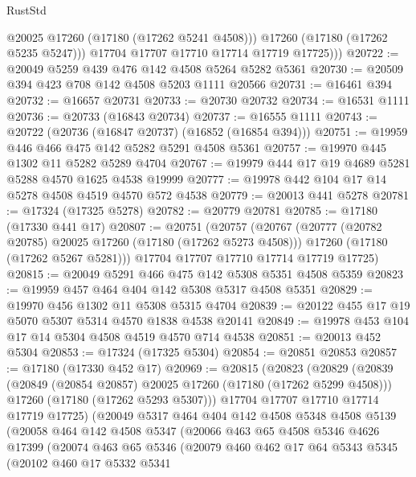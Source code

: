 \begin{lexlean}{RustStd}
\begin{coremodule}
              @20025
              @17260
              (@17180 (@17262 @5241 @4508)))
            @17260
            (@17180 (@17262 @5235 @5247)))
          @17704
          @17707
          @17710
          @17714
          @17719
          @17725)))
@20722 := @20049 @5259 @439 @476 @142 @4508 @5264 @5282 @5361
@20730 := @20509 @394 @423 @708 @142 @4508 @5203 @1111 @20566
@20731 := @16461 @394
@20732 := @16657 @20731
@20733 := @20730 @20732
@20734 := @16531 @1111
@20736 := @20733 (@16843 @20734)
@20737 := @16555 @1111
@20743 := @20722 (@20736 (@16847 @20737) (@16852 (@16854 @394)))
@20751 := @19959 @446 @466 @475 @142 @5282 @5291 @4508 @5361
@20757 := @19970 @445 @1302 @11 @5282 @5289 @4704
@20767 := @19979 @444 @17 @19 @4689 @5281 @5288 @4570 @1625 @4538 @19999
@20777 := @19978 @442 @104 @17 @14 @5278 @4508 @4519 @4570 @572 @4538
@20779 := @20013 @441 @5278
@20781 := @17324 (@17325 @5278)
@20782 := @20779 @20781
@20785 := @17180 (@17330 @441 @17)
@20807 := @20751
    (@20757
      (@20767
        (@20777 (@20782 @20785) @20025 @17260 (@17180 (@17262 @5273 @4508)))
        @17260
        (@17180 (@17262 @5267 @5281)))
      @17704
      @17707
      @17710
      @17714
      @17719
      @17725)
@20815 := @20049 @5291 @466 @475 @142 @5308 @5351 @4508 @5359
@20823 := @19959 @457 @464 @404 @142 @5308 @5317 @4508 @5351
@20829 := @19970 @456 @1302 @11 @5308 @5315 @4704
@20839 := @20122 @455 @17 @19 @5070 @5307 @5314 @4570 @1838 @4538 @20141
@20849 := @19978 @453 @104 @17 @14 @5304 @4508 @4519 @4570 @714 @4538
@20851 := @20013 @452 @5304
@20853 := @17324 (@17325 @5304)
@20854 := @20851 @20853
@20857 := @17180 (@17330 @452 @17)
@20969 := @20815
    (@20823
      (@20829
        (@20839
          (@20849 (@20854 @20857) @20025 @17260 (@17180 (@17262 @5299 @4508)))
          @17260
          (@17180 (@17262 @5293 @5307)))
        @17704
        @17707
        @17710
        @17714
        @17719
        @17725)
      (@20049
        @5317
        @464
        @404
        @142
        @4508
        @5348
        @4508
        @5139
        (@20058
          @464
          @142
          @4508
          @5347
          (@20066
            @463
            @65
            @4508
            @5346
            @4626
            @17399
            (@20074
              @463
              @65
              @5346
              (@20079
                @460
                @462
                @17
                @64
                @5343
                @5345
                (@20102
                  @460
                  @17
                  @5332
                  @5341

\end{coremodule}
\end{lexlean}
